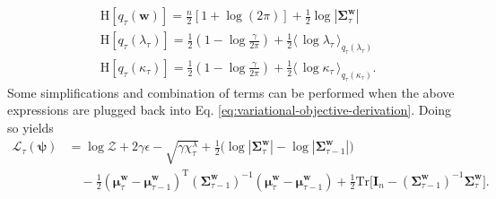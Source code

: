 \begin{align}
	\\
	& \mathrm{H}[q_{\tau}(\mathbf{w})]
	= \frac{n}{2}[1+\log(2\pi)] + \frac{1}{2}\log|\boldsymbol{\Sigma}_\tau^\mathbf{w}|
	\\
	& \mathrm{H}[q_{\tau}(\lambda_\tau)]
	= \frac{1}{2}\left(1 - \log\frac{\gamma}{2\pi}\right)
	+ \frac{1}{2}\langle\,\log\lambda_\tau\,\rangle_{q_{\tau}(\lambda_\tau)}
	\\
	& \mathrm{H}[q_{\tau}(\kappa_\tau)]
	= \frac{1}{2}\left(1 - \log\frac{\gamma}{2\pi}\right)
	+ \frac{1}{2}\langle\,\log\kappa_\tau\,\rangle_{q_{\tau}(\kappa_\tau)}.
\end{align}
Some simplifications and combination of terms can be performed when the above expressions are plugged back into Eq. \eqref{eq:variational-objective-derivation}. Doing so yields
\begin{equation}
\label{eq:variational-objective-final}
\begin{split}
	\mathcal{L}_{\tau}(\boldsymbol{\psi})
	&= \log\mathcal{Z} + 2\gamma\epsilon - \sqrt{\gamma\chi_\tau^\lambda}
	+ \frac{1}{2}\big(\log|\boldsymbol{\Sigma}_{\tau}^\mathbf{w}| - \log|\boldsymbol{\Sigma}_{\tau-1}^\mathbf{w}|\big)
	\\
	& \quad - \frac{1}{2}(\boldsymbol{\mu}_{\tau}^\mathbf{w}-\boldsymbol{\mu}_{\tau-1}^\mathbf{w})^\text{T}(\boldsymbol{\Sigma}_{\tau-1}^\mathbf{w})^{-1}(\boldsymbol{\mu}_{\tau}^\mathbf{w}-\boldsymbol{\mu}_{\tau-1}^\mathbf{w})
	+ \frac{1}{2}\mathrm{Tr}\big[\mathbf{I}_n - (\boldsymbol{\Sigma}_{\tau-1}^\mathbf{w})^{-1}\boldsymbol{\Sigma}_{\tau}^\mathbf{w}\big].
\end{split}
\end{equation}

